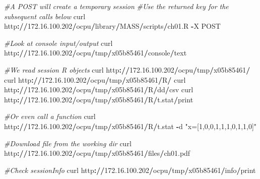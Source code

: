 \documentclass[]{book}
\newenvironment{Shaded}{\begin{snugshade}}{\end{snugshade}}
\newcommand{\FloatTok}[1]{\textcolor[rgb]{0.00,0.00,0.81}{#1}}
\newcommand{\StringTok}[1]{\textcolor[rgb]{0.31,0.60,0.02}{#1}}
\newcommand{\CommentTok}[1]{\textcolor[rgb]{0.56,0.35,0.01}{\textit{#1}}}
\newcommand{\OperatorTok}[1]{\textcolor[rgb]{0.81,0.36,0.00}{\textbf{#1}}}
\newcommand{\ErrorTok}[1]{\textcolor[rgb]{0.64,0.00,0.00}{\textbf{#1}}}
\newcommand{\NormalTok}[1]{#1}
\begin{document}
\begin{Shaded}
\begin{Highlighting}[]
\CommentTok{#A POST will create a temporary session}
\CommentTok{#Use the returned key for the subsequent calls below}
\NormalTok{curl http}\OperatorTok{:}\ErrorTok{//}\FloatTok{172.16}\NormalTok{.}\FloatTok{100.202}\OperatorTok{/}\NormalTok{ocpu}\OperatorTok{/}\NormalTok{library}\OperatorTok{/}\NormalTok{MASS}\OperatorTok{/}\NormalTok{scripts}\OperatorTok{/}\NormalTok{ch01.R }\OperatorTok{-}\NormalTok{X POST}

\CommentTok{#Look at console input/output}
\NormalTok{curl http}\OperatorTok{:}\ErrorTok{//}\FloatTok{172.16}\NormalTok{.}\FloatTok{100.202}\OperatorTok{/}\NormalTok{ocpu}\OperatorTok{/}\NormalTok{tmp}\OperatorTok{/}\NormalTok{x05b85461}\OperatorTok{/}\NormalTok{console}\OperatorTok{/}\NormalTok{text}

\CommentTok{#We read session R objects}
\NormalTok{curl http}\OperatorTok{:}\ErrorTok{//}\FloatTok{172.16}\NormalTok{.}\FloatTok{100.202}\OperatorTok{/}\NormalTok{ocpu}\OperatorTok{/}\NormalTok{tmp}\OperatorTok{/}\NormalTok{x05b85461}\OperatorTok{/}
\NormalTok{curl http}\OperatorTok{:}\ErrorTok{//}\FloatTok{172.16}\NormalTok{.}\FloatTok{100.202}\OperatorTok{/}\NormalTok{ocpu}\OperatorTok{/}\NormalTok{tmp}\OperatorTok{/}\NormalTok{x05b85461}\OperatorTok{/}\NormalTok{R}\OperatorTok{/}
\NormalTok{curl http}\OperatorTok{:}\ErrorTok{//}\FloatTok{172.16}\NormalTok{.}\FloatTok{100.202}\OperatorTok{/}\NormalTok{ocpu}\OperatorTok{/}\NormalTok{tmp}\OperatorTok{/}\NormalTok{x05b85461}\OperatorTok{/}\NormalTok{R}\OperatorTok{/}\NormalTok{dd}\OperatorTok{/}\NormalTok{csv}
\NormalTok{curl http}\OperatorTok{:}\ErrorTok{//}\FloatTok{172.16}\NormalTok{.}\FloatTok{100.202}\OperatorTok{/}\NormalTok{ocpu}\OperatorTok{/}\NormalTok{tmp}\OperatorTok{/}\NormalTok{x05b85461}\OperatorTok{/}\NormalTok{R}\OperatorTok{/}\NormalTok{t.stat}\OperatorTok{/}\NormalTok{print}

\CommentTok{#Or even call a function}
\NormalTok{curl http}\OperatorTok{:}\ErrorTok{//}\FloatTok{172.16}\NormalTok{.}\FloatTok{100.202}\OperatorTok{/}\NormalTok{ocpu}\OperatorTok{/}\NormalTok{tmp}\OperatorTok{/}\NormalTok{x05b85461}\OperatorTok{/}\NormalTok{R}\OperatorTok{/}\NormalTok{t.stat }\OperatorTok{-}\NormalTok{d }\StringTok{"x=[1,0,0,1,1,1,0,1,1,0]"}

\CommentTok{#Download file from the working dir}
\NormalTok{curl http}\OperatorTok{:}\ErrorTok{//}\FloatTok{172.16}\NormalTok{.}\FloatTok{100.202}\OperatorTok{/}\NormalTok{ocpu}\OperatorTok{/}\NormalTok{tmp}\OperatorTok{/}\NormalTok{x05b85461}\OperatorTok{/}\NormalTok{files}\OperatorTok{/}\NormalTok{ch01.pdf}

\CommentTok{#Check sessionInfo}
\NormalTok{curl http}\OperatorTok{:}\ErrorTok{//}\FloatTok{172.16}\NormalTok{.}\FloatTok{100.202}\OperatorTok{/}\NormalTok{ocpu}\OperatorTok{/}\NormalTok{tmp}\OperatorTok{/}\NormalTok{x05b85461}\OperatorTok{/}\NormalTok{info}\OperatorTok{/}\NormalTok{print}
\end{Highlighting}
\end{Shaded}
\end{document}
